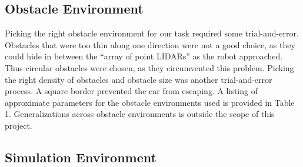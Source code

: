 \documentclass{article}
\begin{document}
\subsection{Obstacle Environment}
Picking the right obstacle environment for our task required some trial-and-error.  Obstacles that were too thin along one direction were not a good choice, as they could hide in between the ``array of point LIDARs'' as the robot approached.  Thus circular obstacles were chosen, as they circumvented this problem.  Picking the right density of obstacles and obstacle size was another trial-and-error process.  A square border prevented the car from escaping.  A listing of approximate parameters for the obstacle environments used is provided in Table 1.  Generalizations across obstacle environments is outside the scope of this project.
%
\begin{center}
\end{center}

\subsection{Simulation Environment}
\end{document}
